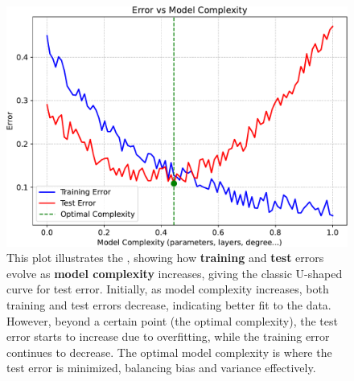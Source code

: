 \begin{figure}[!htp]
    \centering
    \includegraphics[width=.95\textwidth]{img/neural-networks-and-overfitting/error-vs-model-complexity.pdf}
    \caption{This plot illustrates the , showing how \textbf{training} and \textbf{test} errors evolve as \textbf{model complexity} increases, giving the classic U-shaped curve for test error. Initially, as model complexity increases, both training and test errors decrease, indicating better fit to the data. However, beyond a certain point (the optimal complexity), the test error starts to increase due to overfitting, while the training error continues to decrease. The optimal model complexity is where the test error is minimized, balancing bias and variance effectively.}
    \label{fig:error-vs-model-complexity}
\end{figure}